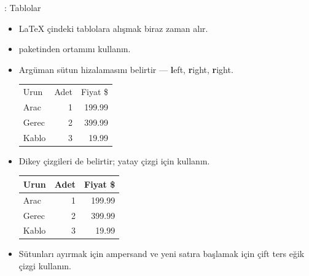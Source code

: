\documentclass[aspectratio=169]{beamer}
\begin{document}
\begin{frame}[fragile]{\insertsection: Tablolar}
\begin{itemize}
\item \LaTeX{} çindeki tablolara alışmak biraz zaman alır.
\item {} paketinden  ortamını kullanın.
\item Argüman sütun hizalamasını belirtir --- \textbf{l}eft, \textbf{r}ight, \textbf{r}ight.
\begin{exampletwouptiny}
\begin{tabular}{lrr}
Urun   & Adet & Fiyat \$ \\
Arac & 1   & 199.99  \\
Gerec & 2   & 399.99  \\
Kablo  & 3   & 19.99   \\
\end{tabular}
\end{exampletwouptiny}
\item Dikey çizgileri de belirtir; yatay çizgi için  kullanın.
\begin{exampletwouptiny}
\begin{tabular}{|l|r|r|} \hline
Urun   & Adet & Fiyat \$ \\\hline
Arac & 1   & 199.99  \\
Gerec & 2   & 399.99  \\
Kablo  & 3   & 19.99   \\\hline
\end{tabular}
\end{exampletwouptiny}
\item Sütunları ayırmak için ampersand \keystrokebftt{\&} ve yeni satıra başlamak için çift ters eğik çizgi \keystrokebftt{\bs}\keystrokebftt{\bs} kullanın.
\end{itemize}
\end{frame}
\end{document}
